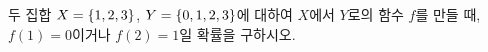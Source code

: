 두 집합 $X=\{1{,}\mkern3mu\mathopen{}2{,}\mkern3mu\mathopen{}3\}$, $Y=\{0{,}\mkern3mu\mathopen{}1{,}\mkern3mu\mathopen{}2{,}\mkern3mu\mathopen{}3\}$에 대하여 $X$에서 $Y$로의 함수 $f$를 만들 때, $f(1)=0$이거나 $f(2)=1$일 확률을 구하시오.
